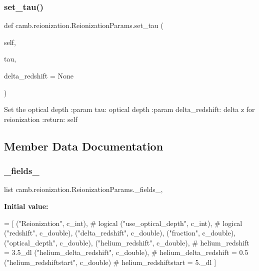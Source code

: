 \subsubsection{\texorpdfstring{set\+\_\+tau()}{set\_tau()}}
{\footnotesize\ttfamily def camb.\+reionization.\+Reionization\+Params.\+set\+\_\+tau (\begin{DoxyParamCaption}\item[{}]{self,  }\item[{}]{tau,  }\item[{}]{delta\+\_\+redshift = {\ttfamily None} }\end{DoxyParamCaption})}

\begin{DoxyVerb}Set the optical depth
:param tau: optical depth
:param delta_redshift: delta z for reionization
:return: self
\end{DoxyVerb}
 

\subsection{Member Data Documentation}
\mbox{\label{classcamb_1_1reionization_1_1ReionizationParams_ac78689867e8359453ae901e9bd562e21}} 
\subsubsection{\texorpdfstring{\+\_\+fields\+\_\+}{\_fields\_}}
{\footnotesize\ttfamily list camb.\+reionization.\+Reionization\+Params.\+\_\+fields\+\_\+\hspace{0.3cm}{\ttfamily [static]}, {\ttfamily [private]}}

{\bfseries Initial value\+:}
\begin{DoxyCode}
=  [
        (\textcolor{stringliteral}{"Reionization"}, c\_int),  \textcolor{comment}{# logical}
        (\textcolor{stringliteral}{"use\_optical\_depth"}, c\_int),  \textcolor{comment}{# logical}
        (\textcolor{stringliteral}{"redshift"}, c\_double),
        (\textcolor{stringliteral}{"delta\_redshift"}, c\_double),
        (\textcolor{stringliteral}{"fraction"}, c\_double),
        (\textcolor{stringliteral}{"optical\_depth"}, c\_double),
        (\textcolor{stringliteral}{"helium\_redshift"}, c\_double),  \textcolor{comment}{# helium\_redshift  = 3.5\_dl}
        (\textcolor{stringliteral}{"helium\_delta\_redshift"}, c\_double),  \textcolor{comment}{# helium\_delta\_redshift  = 0.5}
        (\textcolor{stringliteral}{"helium\_redshiftstart"}, c\_double)  \textcolor{comment}{# helium\_redshiftstart  = 5.\_dl}
    ]
\end{DoxyCode}


